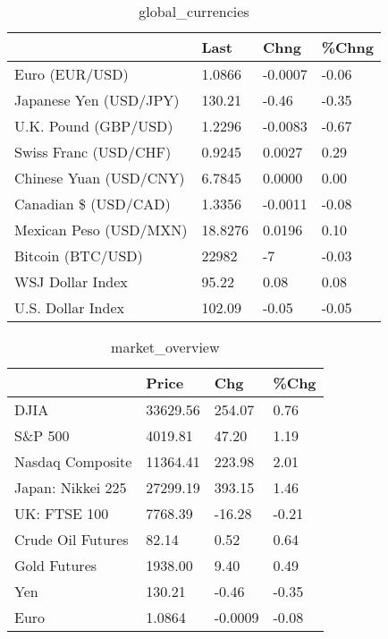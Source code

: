 \documentclass{article}%
\begin{document}
%


\begin{table}[htbp]%
\caption{global\_currencies}%
\centering%
\begin{adjustbox}{width=1\textwidth}%
\begin{tabular}{llll}
\toprule
                       &    Last &    Chng & \%Chng \\
\midrule
        Euro (EUR/USD) &  1.0866 & -0.0007 & -0.06 \\
Japanese Yen (USD/JPY) &  130.21 &   -0.46 & -0.35 \\
  U.K. Pound (GBP/USD) &  1.2296 & -0.0083 & -0.67 \\
 Swiss Franc (USD/CHF) &  0.9245 &  0.0027 &  0.29 \\
Chinese Yuan (USD/CNY) &  6.7845 &  0.0000 &  0.00 \\
  Canadian \$ (USD/CAD) &  1.3356 & -0.0011 & -0.08 \\
Mexican Peso (USD/MXN) & 18.8276 &  0.0196 &  0.10 \\
     Bitcoin (BTC/USD) &   22982 &      -7 & -0.03 \\
      WSJ Dollar Index &   95.22 &    0.08 &  0.08 \\
     U.S. Dollar Index &  102.09 &   -0.05 & -0.05 \\
\bottomrule
\end{tabular}
%
\end{adjustbox}%
\end{table}

%


\begin{table}[htbp]%
\caption{market\_overview}%
\centering%
\begin{adjustbox}{width=1\textwidth}%
\begin{tabular}{llll}
\toprule
                  &    Price &     Chg &  \%Chg \\
\midrule
             DJIA & 33629.56 &  254.07 &  0.76 \\
          S\&P 500 &  4019.81 &   47.20 &  1.19 \\
 Nasdaq Composite & 11364.41 &  223.98 &  2.01 \\
Japan: Nikkei 225 & 27299.19 &  393.15 &  1.46 \\
     UK: FTSE 100 &  7768.39 &  -16.28 & -0.21 \\
Crude Oil Futures &    82.14 &    0.52 &  0.64 \\
     Gold Futures &  1938.00 &    9.40 &  0.49 \\
              Yen &   130.21 &   -0.46 & -0.35 \\
             Euro &   1.0864 & -0.0009 & -0.08 \\
\bottomrule
\end{tabular}
%
\end{adjustbox}%
\end{table}

%
\end{document}
